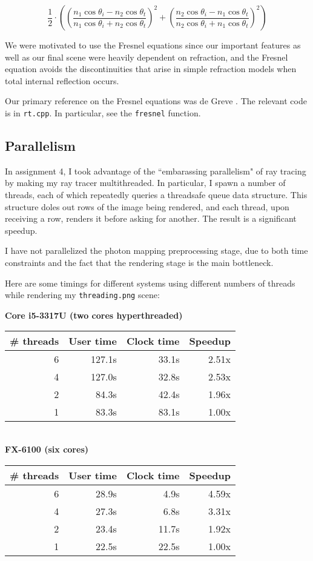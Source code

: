\documentclass{article}
\begin{document}
$$\frac{1}{2} \cdot \left(\left(\frac{n_1 \cos\theta_i - n_2 \cos\theta_t}{n_1
\cos\theta_i + n_2\cos\theta_t}\right)^2 + \left(\frac{n_2 \cos\theta_i -
n_1\cos\theta_t}{n_2\cos\theta_i + n_1\cos\theta_t}\right)^2\right)$$

We were motivated to use the Fresnel equations since our important features as
well as our final scene were heavily dependent on refraction, and the Fresnel
equation avoids the discontinuities that arise in simple refraction models
when total internal reflection occurs.

Our primary reference on the Fresnel equations was de Greve \cite{degreve}. The
relevant code is in {\tt rt.cpp}. In particular, see the {\tt fresnel} function.

\subsection{Parallelism}

In assignment 4, I took advantage of the ``embarassing parallelism" of ray
tracing by making my ray tracer multithreaded. In particular, I spawn a number
of threads, each of which repeatedly queries a threadsafe queue data structure.
This structure doles out rows of the image being rendered, and each thread, upon
receiving a row, renders it before asking for another. The result is a
significant speedup.

I have not parallelized the photon mapping preprocessing stage, due to both time
constraints and the fact that the rendering stage is the main bottleneck.

Here are some timings for different systems using different numbers of threads
while rendering my {\tt threading.png} scene:

\begin{center}
\noindent\textbf{Core i5-3317U (two cores hyperthreaded)} \\
\begin{tabular}{|r|r|r|r|} \hline
  \# threads & User time & Clock time & Speedup \\\hline
           6 & 127.1s & 33.1s & 2.51x \\\hline
  4 & 127.0s & 32.8s & 2.53x \\\hline
  2 & 84.3s & 42.4s & 1.96x \\\hline
  1 & 83.3s & 83.1s & 1.00x \\\hline
\end{tabular} \\

\noindent\textbf{FX-6100 (six cores)} \\
  \begin{tabular}{|r|r|r|r|} \hline
  \# threads & User time & Clock time & Speedup \\\hline
           6 & 28.9s & 4.9s & 4.59x \\\hline
           4 & 27.3s & 6.8s & 3.31x \\\hline
           2 & 23.4s & 11.7s & 1.92x \\\hline
           1 & 22.5s & 22.5s & 1.00x \\\hline
  \end{tabular}

\end{center}
\end{document}
